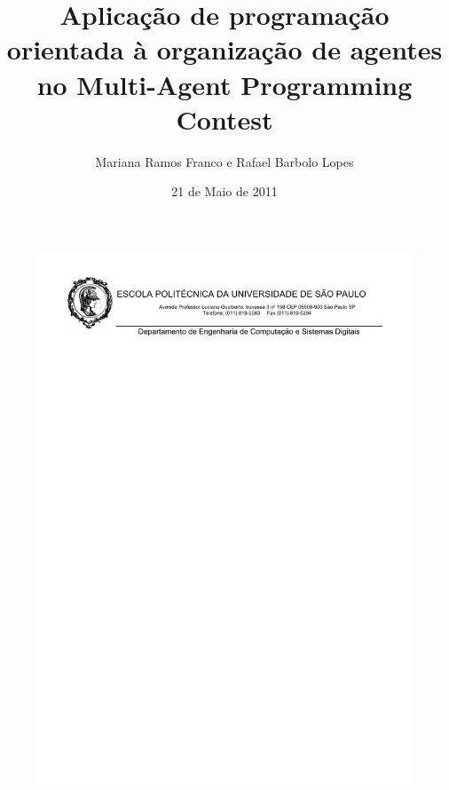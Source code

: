 \documentclass{llncs}
\begin{document}
\begin{figure}[!t]
\centering 
\includegraphics[width=15.5cm]{images/logo.pdf}
\end{figure}

\title{Aplicação de programação orientada à organização de agentes no Multi-Agent Programming Contest}
\author{Mariana Ramos Franco e Rafael Barbolo Lopes}
\date{21 de Maio de 2011}

\maketitle
\end{document}
